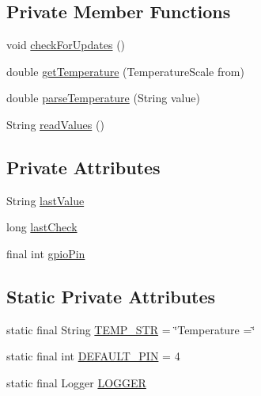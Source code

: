 \subsection*{Private Member Functions}
\begin{DoxyCompactItemize}
\item 
void \hyperlink{classcom_1_1libsensorj_1_1concretesensor_1_1DHT11Temperature_a0ed494577e6a3c68dc737b60f926269d}{check\+For\+Updates} ()
\item 
double \hyperlink{classcom_1_1libsensorj_1_1concretesensor_1_1DHT11Temperature_abb836186013ae429e2cfde981154969b}{get\+Temperature} (Temperature\+Scale from)
\item 
double \hyperlink{classcom_1_1libsensorj_1_1concretesensor_1_1DHT11Temperature_a061220e6439c2014ab81384738c07734}{parse\+Temperature} (String value)
\item 
String \hyperlink{classcom_1_1libsensorj_1_1concretesensor_1_1DHT11Temperature_a2e5125c490d1b7b28a359cf702334fd7}{read\+Values} ()
\end{DoxyCompactItemize}
\subsection*{Private Attributes}
\begin{DoxyCompactItemize}
\item 
String \hyperlink{classcom_1_1libsensorj_1_1concretesensor_1_1DHT11Temperature_af16dd6a4c88dedacb8a4d69d90eff670}{last\+Value}
\item 
long \hyperlink{classcom_1_1libsensorj_1_1concretesensor_1_1DHT11Temperature_a00ec2e3e31bcaf04f497d5c503a84c5e}{last\+Check}
\item 
final int \hyperlink{classcom_1_1libsensorj_1_1concretesensor_1_1DHT11Temperature_a312572f2f0bad8b41d171481ef4e3138}{gpio\+Pin}
\end{DoxyCompactItemize}
\subsection*{Static Private Attributes}
\begin{DoxyCompactItemize}
\item 
static final String \hyperlink{classcom_1_1libsensorj_1_1concretesensor_1_1DHT11Temperature_a123ae6845e0cc1d1ec859cf7cfb78004}{T\+E\+M\+P\+\_\+\+S\+T\+R} = \char`\"{}Temperature =\char`\"{}
\item 
static final int \hyperlink{classcom_1_1libsensorj_1_1concretesensor_1_1DHT11Temperature_af8bf5091500d4dcb3b5a0663279359e2}{D\+E\+F\+A\+U\+L\+T\+\_\+\+P\+I\+N} = 4
\item 
static final Logger \hyperlink{classcom_1_1libsensorj_1_1concretesensor_1_1DHT11Temperature_a96d485fc09496c1b5a320a30bb3400c9}{L\+O\+G\+G\+E\+R}
\end{DoxyCompactItemize}


